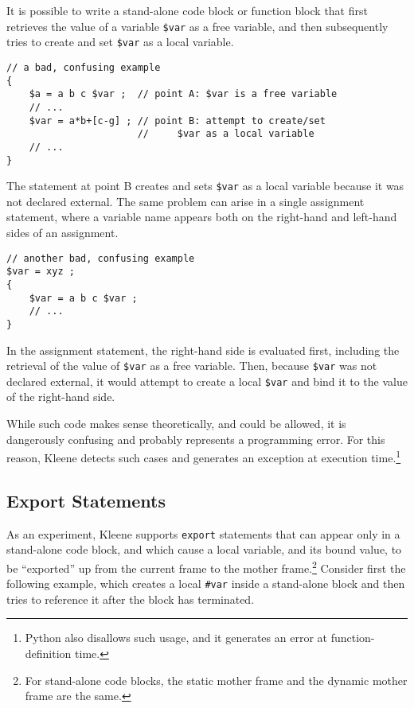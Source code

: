 It is possible to write a stand-alone code block or function block that first retrieves
the value of a
variable \verb!$var! as a free variable, and then subsequently tries to create and set
\verb!$var! as a local variable.

\begin{samepage}
\begin{Verbatim}
// a bad, confusing example
{
    $a = a b c $var ;  // point A: $var is a free variable
    // ...
    $var = a*b+[c-g] ; // point B: attempt to create/set
                       //     $var as a local variable
    // ...
}
\end{Verbatim}
\end{samepage}

\noindent
The statement at point B creates and sets \verb!$var! as a local variable because it was
not declared external.  The same problem can arise in a single assignment statement,
where a variable name appears both on the right-hand and left-hand sides of an
assignment.

\begin{samepage}
\begin{Verbatim}
// another bad, confusing example
$var = xyz ;
{
    $var = a b c $var ;  
    // ...
}
\end{Verbatim}
\end{samepage}

\noindent
In the assignment statement, the right-hand side is evaluated first, including the
retrieval of the value of \verb!$var! as a free variable.  Then, because \verb!$var! was
not declared external, it would attempt to create a local \verb!$var! and bind it to the
value of the right-hand side.


While such code makes sense theoretically, and could be allowed,
it is dangerously confusing and probably represents a programming error.  For this
reason, Kleene detects such cases and generates an exception at execution
time.\footnote{Python also disallows such usage, and it generates an error at
function-definition time.}


\subsection{Export Statements}

As an experiment, Kleene supports \texttt{export} statements that can
appear only in a stand-alone code block, and which cause a local
variable, and its bound value, to be ``exported'' up from the current
frame to the mother frame.\footnote{For stand-alone code blocks, the
static mother frame and the dynamic mother frame are the same.} Consider
first the following example, which creates a local \verb!#var! inside a
stand-alone block and then tries to reference it after the block has
terminated.

